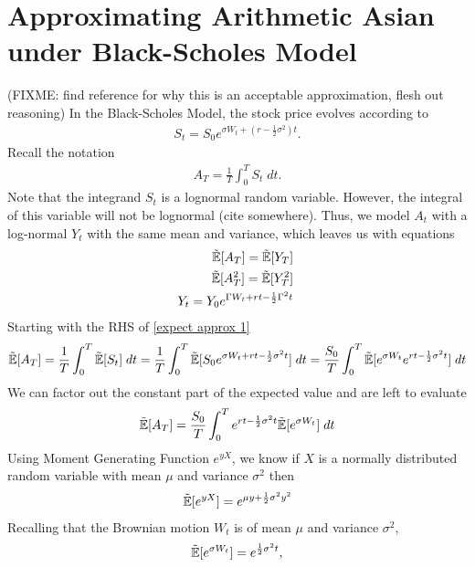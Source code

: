 \documentclass[reqno]{amsart}
\newcommand{\rE}[1]{\tilde{\E}[#1]}
\begin{document}
\section{Approximating Arithmetic Asian under Black-Scholes Model}
(FIXME: find reference for why this is an acceptable approximation, flesh out reasoning)
In the Black-Scholes Model, the stock price evolves according to
\begin{align} 
     S_t = S_0e^{\sigma W_t+(r - \frac{1}{2} \sigma^2)t}.
\end{align}
Recall the notation
\begin{align}
     A_T = \frac{1}{T}\int_0^T S_t \; dt.
\end{align}
Note that the integrand $S_t$ is a lognormal random variable. However, the integral of this variable will not be lognormal (cite somewhere). Thus, we model $A_t$ with a log-normal $Y_t$ with the same mean and variance, which leaves us with equations
\begin{align} \label{expect approx 1}
     \tilde{\mathbb{E}}[A_T] = \tilde{\mathbb{E}}[Y_T] \; \\
     \label{expect approx 2}
     \tilde{\mathbb{E}}[A_T^2] = \tilde{\mathbb{E}}[Y_T^2] \; \\
     Y_t = Y_0e^{\Gamma W_t+rt-\frac{1}{2}\Gamma^2t} \;
\end{align}
Starting with the RHS of \eqref{expect approx 1}
\begin{align} 
     \rE{A_T} 
     = \frac{1}{T} \int_0^T \tilde{\E}[S_t] \; dt 
     = \frac{1}{T} \int_0^T \tilde{\E}[S_0 e^{\sigma W_t+rt-\frac{1}{2}\sigma^2t}] \; dt
     = \frac{S_0}{T} \int_0^T\rE{e^{\sigma W_t}e^{rt-\frac{1}{2}\sigma^2t}} \; dt
\end{align}
We can factor out the constant part of the expected value and are left to evaluate
\begin{align} \label{simplified expected A_T}
     \rE{A_T} = \frac{S_0}{T} \int_0^T e^{rt-\frac{1}{2}\sigma^2t} \rE{e^{\sigma W_t}}  \; dt
\end{align}
Using Moment Generating Function $e^{yX}$, we know if $X$ is a normally distributed random variable with mean $\mu$ and variance $\sigma^2$ then
\begin{align} \label{moment 1}
     \rE{e^{yX}}
     = e^{\mu y + \frac{1}{2} \sigma^2 y^2}
\end{align}
Recalling that the Brownian motion $W_t$ is of mean $\mu$ and variance $\sigma^2$, 
\begin{align} 
     \rE{e^{\sigma W_t}}
     = e^{\frac{1}{2}\sigma^2 t},
\end{align}
\end{document}
